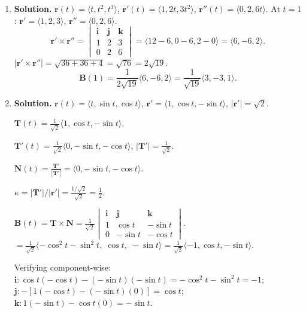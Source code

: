 \begin{enumerate}
So $\mathbf{r}'''(0)=\langle 0,-30,-27\rangle$.

Torsion: $\tau = \frac{(\mathbf{r}'\times\mathbf{r}'')\cdot\mathbf{r}'''}{|\mathbf{r}'\times\mathbf{r}''|^2}$.
\[
\langle 0,-36,36\rangle\cdot\langle 0,-30,-27\rangle = 0+1080-972=108.
\]
$|\mathbf{r}'\times\mathbf{r}''|^2=(36\sqrt{2})^2=2592$.
\[
\tau(0)=\frac{108}{2592}=\frac{1}{24}.
\]
\[
\boxed{\kappa(0)=\frac{2}{3},\qquad \tau(0)=\frac{1}{24}.}
\]

\item \textbf{Solution.}
$\mathbf{r}(t)=\langle t, t^2, t^3\rangle$, $\mathbf{r}'(t)=\langle 1,2t,3t^2\rangle$, $\mathbf{r}''(t)=\langle 0,2,6t\rangle$.
At $t=1$: $\mathbf{r}'=\langle 1,2,3\rangle$, $\mathbf{r}''=\langle 0,2,6\rangle$.
\[
\mathbf{r}'\times\mathbf{r}''=\begin{vmatrix}\mathbf{i}&\mathbf{j}&\mathbf{k}\\1&2&3\\0&2&6\end{vmatrix}=\langle 12-6, 0-6, 2-0\rangle = \langle 6,-6,2\rangle.
\]
$|\mathbf{r}'\times\mathbf{r}''|=\sqrt{36+36+4}=\sqrt{76}=2\sqrt{19}$.
\[
\boxed{\mathbf{B}(1)=\frac{1}{2\sqrt{19}}\langle 6,-6,2\rangle = \frac{1}{\sqrt{19}}\langle 3,-3,1\rangle.}
\]

\item \textbf{Solution.}
$\mathbf{r}(t)=\langle t, \sin t, \cos t\rangle$, $\mathbf{r}'=\langle 1, \cos t, -\sin t\rangle$, $|\mathbf{r}'|=\sqrt{2}$.

$\mathbf{T}(t)=\frac{1}{\sqrt{2}}\langle 1, \cos t, -\sin t\rangle$.

$\mathbf{T}'(t)=\frac{1}{\sqrt{2}}\langle 0, -\sin t, -\cos t\rangle$, $|\mathbf{T}'|=\frac{1}{\sqrt{2}}$.

$\mathbf{N}(t)=\frac{\mathbf{T}'}{|\mathbf{T}'|}=\langle 0, -\sin t, -\cos t\rangle$.

$\kappa = |\mathbf{T}'|/|\mathbf{r}'| = \frac{1/\sqrt{2}}{\sqrt{2}}=\frac{1}{2}$.

$\mathbf{B}(t)=\mathbf{T}\times\mathbf{N}=\frac{1}{\sqrt{2}}\begin{vmatrix}\mathbf{i}&\mathbf{j}&\mathbf{k}\\1&\cos t&-\sin t\\0&-\sin t&-\cos t\end{vmatrix}$.
$=\frac{1}{\sqrt{2}}\langle -\cos^2 t-\sin^2 t,\; \cos t, \; -\sin t\rangle = \frac{1}{\sqrt{2}}\langle -1, \cos t, -\sin t\rangle$.

Verifying component-wise: $\mathbf{i}: \cos t(-\cos t)-(-\sin t)(-\sin t)=-\cos^2 t-\sin^2 t = -1$;
$\mathbf{j}: -[1(-\cos t)-(-\sin t)(0)]=\cos t$;
$\mathbf{k}: 1(-\sin t)-\cos t(0)=-\sin t$.


\end{enumerate}
